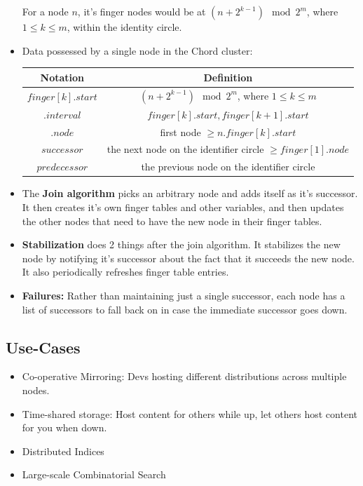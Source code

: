 \documentclass[parskip=half]{scrartcl}
\begin{document}
\begin{itemize}
        For a node $n$, it's finger nodes would be at $(n + 2^{k-1}) \mod 2^m$, where $1 \leq k \leq m$, within the identity circle.
        \item
        Data possessed by a single node in the Chord cluster:\\
        \begin{tabular}{|| c | c ||}
        \hline\hline
        \textbf{Notation} & \textbf{Definition} \\
        \hline\hline
        $finger[k].start$  &  $(n + 2^{k-1}) \mod 2^m$, where $1 \leq k \leq m$\\
        \hline
        $.interval$  &  $finger[k].start, finger[k+1].start$\\
        \hline
        $.node$  &  first node $\geq n.finger[k].start$\\
        \hline
        $successor$  &  the next node on the identifier circle $\geq finger[1].node$\\
        \hline
        $predecessor$  &  the previous node on the identifier circle\\
        \hline\hline
        \end{tabular}
        \item
        The \textbf{Join algorithm} picks an arbitrary node and adds itself as it's successor. It then creates it's own finger tables and other variables, and then updates the other nodes that need to have the new node in their finger tables.
        \item
        \textbf{Stabilization} does 2 things after the join algorithm. It stabilizes the new node by notifying it's successor about the fact that it succeeds the new node. It also periodically refreshes finger table entries.
        \item
        \textbf{Failures:} Rather than maintaining just a single successor, each node has a list of successors to fall back on in case the immediate successor goes down.

    \end{itemize}


    \subsection{Use-Cases} %
    \label{sub:use_cases}

    \begin{itemize}
        \item
        Co-operative Mirroring: Devs hosting different distributions across multiple nodes.
        \item
        Time-shared storage: Host content for others while up, let others host content for you when down.
        \item
        Distributed Indices
        \item
        Large-scale Combinatorial Search
    \end{itemize}
\end{document}
